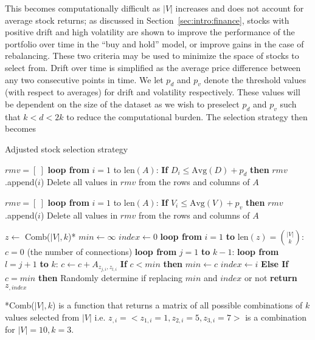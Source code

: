 \noindent This becomes computationally difficult as $|V|$ increases and does 
not account for average stock returns; as discussed in 
Section~\ref{sec:intro:finance}, stocks with positive drift and high volatility 
are shown to improve the performance of the portfolio over time in the ``buy 
and hold'' model, or improve gains in the case of rebalancing. These two 
criteria may be used to minimize the space of stocks to select from. Drift over 
time is simplified as the average price difference between any two consecutive 
points in time. We let $p_d$ and $p_v$ denote the threshold 
values (with respect to averages) for drift and volatility respectively. These 
values will be dependent on the size of the dataset as we wish to preselect 
$p_d$ and $p_v$ such that $k<d<2k$ to reduce the computational burden. The 
selection strategy then becomes

\tablespacing
\begin{algorithm}[H]
	\caption{Adjusted stock selection strategy}\label{alg:usage:stockselection2}
	\begin{algorithmic}[1]
		
		\State $rmv = [\ ]$
		\State \textbf{loop from} $i = 1$ to $\text{len}(A)$:
		\State \indent \textbf{If} $D_i \leq \text{Avg}(D) + p_d$ \textbf{then} 
		$rmv$.append($i$)
		\State Delete all values in $rmv$ from the rows and columns of $A$
		\EndFunction
		
		\State $rmv = [\ ]$
		\State \textbf{loop from} $i = 1$ to $\text{len}(A)$:
		\State \indent \textbf{If} $V_i \leq \text{Avg}(V) + p_v$ \textbf{then} 
		$rmv$.append($i$)
		\State Delete all values in $rmv$ from the rows and columns of $A$
		\EndFunction

		\State $z \gets$ Comb($|V|,k$)*
		\State $min \gets \infty$
		\State $index \gets 0$
		\State \textbf{loop from} $i=1$ \textbf{to} $\text{len}(z) = 
		{|V| \choose k}$:
		\State \indent $c = 0$ (the number of connections)
		\State \indent \textbf{loop from} $j = 1$ \textbf{to} $k-1$:
		\State \indent \indent \textbf{loop from} $l=j+1$ \textbf{to} $k$:
		\State \indent \indent \indent $c \gets c+A_{z_{j,i},z_{l,i}}$
		\State \indent \textbf{If} $c < min$ \textbf{then}
		\State \indent \indent $min \gets c$
		\State \indent \indent $index \gets i$
		\State \indent \textbf{Else If} $c = min$ \textbf{then}
		\State \indent \indent Randomly determine if replacing $min$ and 
		$index$ or not
		\State \textbf{return} $z_{,index}$
		\EndFunction
		\EndProcedure
	\end{algorithmic}
	*Comb($|V|,k$) is a function that returns a matrix of all possible 
	combinations of $k$ values selected from $|V|$ i.e. $z_{,i}=<z_{1,i} = 1, 
	z_{2,i} = 5, z_{3,i} = 7>$ is a combination for $|V|=10,k=3$.
\end{algorithm}
\bodyspacing
